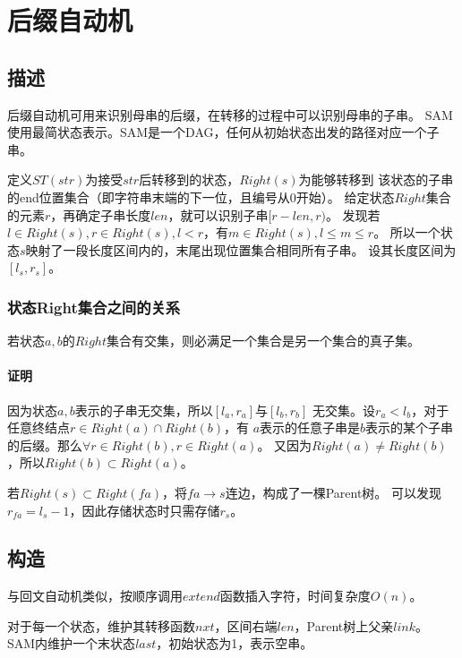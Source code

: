 \section{后缀自动机}
\subsection{描述}
后缀自动机可用来识别母串的后缀，在转移的过程中可以识别母串的子串。
SAM使用最简状态表示。SAM是一个DAG，任何从初始状态出发的路径对应一个子串。

定义$ST(str)$为接受$str$后转移到的状态，$Right(s)$为能够转移到
该状态的子串的end位置集合（即字符串末端的下一位，且编号从0开始）。
给定状态$Right$集合的元素$r$，再确定子串长度$len$，就可以识别子串$[r-len,r)$。
发现若$l\in Right(s),r\in Right(s),l<r$，有$m\in Right(s),l\leq m \leq r$。
所以一个状态$s$映射了一段长度区间内的，末尾出现位置集合相同所有子串。
设其长度区间为$[l_s,r_s]$。

\subsubsection{状态Right集合之间的关系}
\begin{property}
若状态$a,b$的$Right$集合有交集，则必满足一个集合是另一个集合的真子集。
\end{property}
\paragraph{证明} 因为状态$a,b$表示的子串无交集，所以$[l_a,r_a]$与$[l_b,r_b]$
无交集。设$r_a<l_b$，对于任意终结点$r\in Right(a) \cap Right(b)$，有
$a$表示的任意子串是$b$表示的某个子串的后缀。那么$\forall r\in Right(b),r\in Right(a)$。
又因为$Right(a)\neq Right(b)$，所以$Right(b) \subset Right(a)$。

若$Right(s)\subset Right(fa)$，将$fa\rightarrow s$连边，构成了一棵Parent树。
可以发现$r_{fa}=l_s-1$，因此存储状态时只需存储$r_s$。
\subsection{构造}
与回文自动机类似，按顺序调用$extend$函数插入字符，时间复杂度$O(n)$。

对于每一个状态，维护其转移函数$nxt$，区间右端$len$，Parent树上父亲$link$。
SAM内维护一个末状态$last$，初始状态为1，表示空串。

